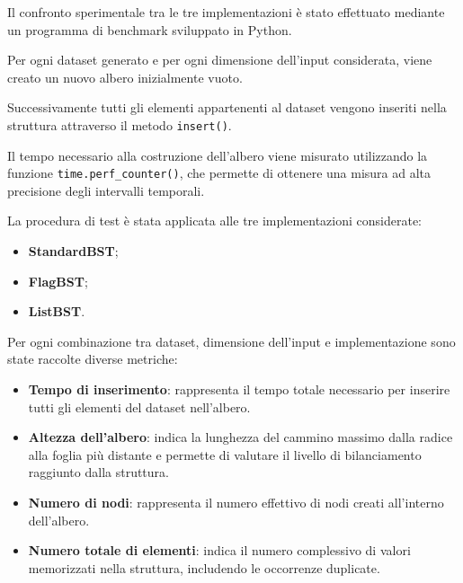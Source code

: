 \documentclass[a4paper,12pt]{article}
\begin{document}
Il confronto sperimentale tra le tre implementazioni è stato effettuato mediante un programma di benchmark sviluppato in Python.

Per ogni dataset generato e per ogni dimensione dell'input considerata, viene creato un nuovo albero inizialmente vuoto.

Successivamente tutti gli elementi appartenenti al dataset vengono inseriti nella struttura attraverso il metodo \texttt{insert()}.

Il tempo necessario alla costruzione dell'albero viene misurato utilizzando la funzione \texttt{time.perf\_counter()}, che permette di ottenere una misura ad alta precisione degli intervalli temporali.

La procedura di test è stata applicata alle tre implementazioni considerate:

\begin{itemize}

    \item \textbf{StandardBST};

    \item \textbf{FlagBST};

    \item \textbf{ListBST}.

\end{itemize}

Per ogni combinazione tra dataset, dimensione dell'input e implementazione sono state raccolte diverse metriche:

\begin{itemize}

    \item \textbf{Tempo di inserimento}: rappresenta il tempo totale necessario per inserire tutti gli elementi del dataset nell'albero.

    \item \textbf{Altezza dell'albero}: indica la lunghezza del cammino massimo dalla radice alla foglia più distante e permette di valutare il livello di bilanciamento raggiunto dalla struttura.

    \item \textbf{Numero di nodi}: rappresenta il numero effettivo di nodi creati all'interno dell'albero.

    \item \textbf{Numero totale di elementi}: indica il numero complessivo di valori memorizzati nella struttura, includendo le occorrenze duplicate.

\end{itemize}
\end{document}
